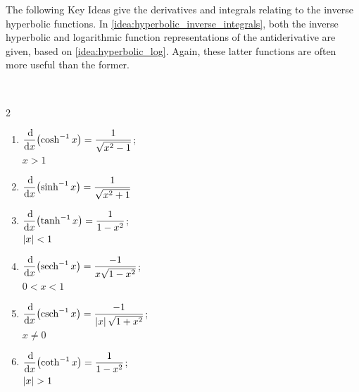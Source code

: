 The following Key Ideas give the derivatives and integrals relating to the inverse hyperbolic functions. In \autoref{idea:hyperbolic_inverse_integrals}, both the inverse hyperbolic and logarithmic function representations of the antiderivative are given, based on \autoref{idea:hyperbolic_log}. Again, these latter functions are often more useful than the former.




{
\begin{keyidea}\label{idea:hyperbolic_inverse_derivatives}%
\mbox{}\\[-2\baselineskip]\parbox[t]{\linewidth}{%
\begin{multicols}{2}
\begin{enumerate}
\item $\displaystyle\frac{\operatorname{d}\!}{\operatorname{d}\! x}\bigl(\cosh^{-1}x\bigr)=\frac1{\sqrt{x^2-1}}$;\\\null\qquad$x>1$
\item $\displaystyle\frac{\operatorname{d}\!}{\operatorname{d}\! x}\bigl(\sinh^{-1}x\bigr)=\frac1{\sqrt{x^2+1}}$\\\vphantom{$x\ne0$}
\item $\displaystyle\frac{\operatorname{d}\!}{\operatorname{d}\! x}\bigl(\tanh^{-1}x\bigr)=\frac1{1-x^2}$;\\\null\qquad$\left\lvert x \right\rvert<1$
\item $\displaystyle\frac{\operatorname{d}\!}{\operatorname{d}\! x}\bigl(\operatorname{sech}^{-1}x\bigr)=\frac{-1}{x\sqrt{1-x^2}}$;\\\null\qquad$0<x<1$
\item $\displaystyle\frac{\operatorname{d}\!}{\operatorname{d}\! x}\bigl(\operatorname{csch}^{-1}x\bigr)=\frac{-1}{\left\lvert x \right\rvert\sqrt{1+x^2}}$;\\\null\qquad$x\neq0$
\item $\displaystyle\frac{\operatorname{d}\!}{\operatorname{d}\! x}\bigl(\coth^{-1}x\bigr)=\frac1{1-x^2}$;\\\null\qquad$\left\lvert x \right\rvert>1$
\end{enumerate}
\end{multicols}}
\end{keyidea}}

